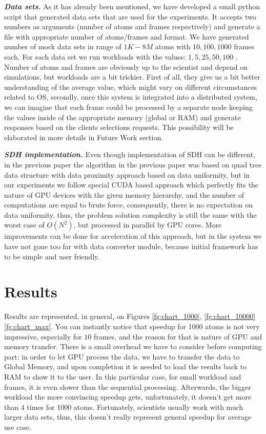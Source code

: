 \documentclass[11pt,a4paper]{report}
\begin{document}
\emph{\textbf{Data sets.}} As it has already been mentioned, we have developed a small python script that generated data sets that are used for the experiments. It accepts two numbers as arguments (number of atoms and frames respectively) and generate a file with appropriate number of atoms/frames and format. We have generated number of mock data sets in range of $1K-8M$ atoms with $10, 100, 1000$ frames each. For each data set we run workloads with the values: $1, 5, 25, 50, 100$ . Number of atoms and frames are obviously up to the scientist and depend on simulations, but workloads are a bit trickier. First of all, they give us a bit better understanding of the average value, which might vary on different circumstances related to OS, secondly, once this system is integrated into a distributed system, we can imagine that each frame could be processed by a separate node keeping the values inside of the appropriate memory (global or RAM) and generate responses based on the clients selections requests. This possibility will be elaborated in more details in Future Work section.

\emph{\textbf{SDH implementation.}} Even though implementation of SDH can be different, in the previous paper the algorithm in the previous paper was based on quad tree data structure with data proximity approach based on data uniformity\cite{mainPaper}, but in our experiments we follow special CUDA based approach which perfectly fits the nature of GPU devices with the given memory hierarchy, and the number of computations are equal to brute force, consequently, there is no expectation on data uniformity, thus, the problem solution complexity is still the same with the worst case of $O(N^2)$, but processed in parallel by GPU cores. More improvements can be done for acceleration of this approach, but in the system we have not gone too far with data converter module, because initial framework has to be simple and user friendly.

\section{Results}
Results are represented, in general, on Figures \ref{fg:chart_1000}, \ref{fg:chart_10000} \ref{fg:chart_max}. You can instantly notice that speedup for 1000 atoms is not very impressive, especially for $10$ frames, and the reason for that is nature of GPU and memory transfer. There is a small overhead we have to consider before computing part: in order to let GPU process the data, we have to transfer the data to Global Memory, and upon completion it is needed to load the results back to RAM to show it to the user. In this particular case, for small workload and frames, it is even slower than the sequential processing. Afterwards, the bigger workload the more convincing speedup gets, unfortunately, it doesn't get more than $4$ times for 1000 atoms. Fortunately, scientists usually work with much larger data sets, thus, this doesn't really represent general speedup for average use case.
\end{document}
